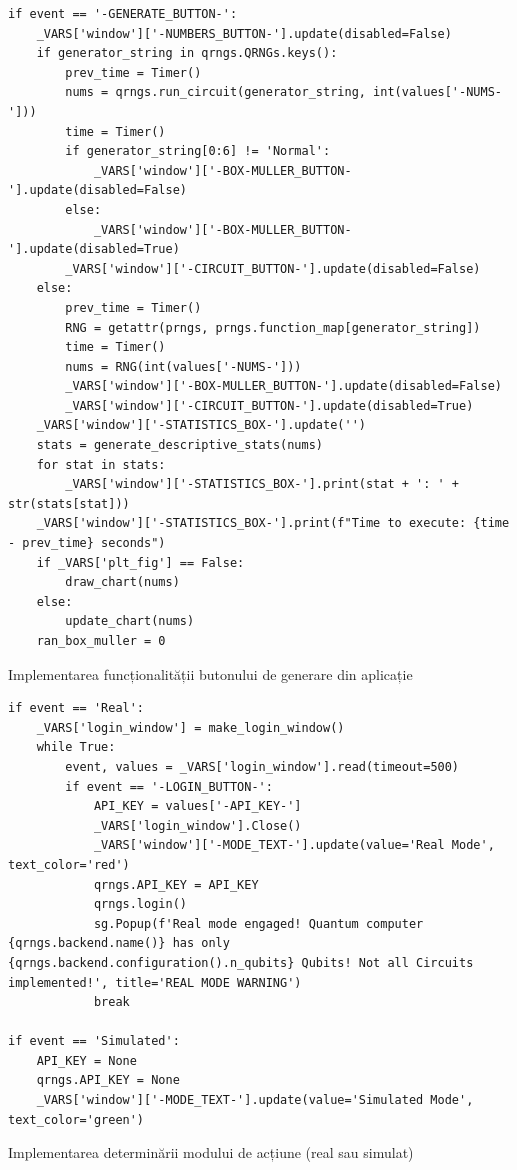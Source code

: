 \begin{code}
\begin{verbatim}
if event == '-GENERATE_BUTTON-':
    _VARS['window']['-NUMBERS_BUTTON-'].update(disabled=False)
    if generator_string in qrngs.QRNGs.keys():
        prev_time = Timer()
        nums = qrngs.run_circuit(generator_string, int(values['-NUMS-']))
        time = Timer()
        if generator_string[0:6] != 'Normal':
            _VARS['window']['-BOX-MULLER_BUTTON-'].update(disabled=False)
        else:
            _VARS['window']['-BOX-MULLER_BUTTON-'].update(disabled=True)
        _VARS['window']['-CIRCUIT_BUTTON-'].update(disabled=False)
    else:
        prev_time = Timer()
        RNG = getattr(prngs, prngs.function_map[generator_string])
        time = Timer()
        nums = RNG(int(values['-NUMS-']))
        _VARS['window']['-BOX-MULLER_BUTTON-'].update(disabled=False)
        _VARS['window']['-CIRCUIT_BUTTON-'].update(disabled=True)
    _VARS['window']['-STATISTICS_BOX-'].update('')
    stats = generate_descriptive_stats(nums)
    for stat in stats:
        _VARS['window']['-STATISTICS_BOX-'].print(stat + ': ' + str(stats[stat]))
    _VARS['window']['-STATISTICS_BOX-'].print(f"Time to execute: {time - prev_time} seconds")
    if _VARS['plt_fig'] == False:
        draw_chart(nums)
    else:
        update_chart(nums)
    ran_box_muller = 0
\end{verbatim}
\caption{Implementarea funcționalității butonului de generare din aplicație}
\end{code}
\newpage
\begin{code}
\begin{verbatim}
if event == 'Real':
    _VARS['login_window'] = make_login_window()
    while True:
        event, values = _VARS['login_window'].read(timeout=500)
        if event == '-LOGIN_BUTTON-':
            API_KEY = values['-API_KEY-']
            _VARS['login_window'].Close()
            _VARS['window']['-MODE_TEXT-'].update(value='Real Mode', text_color='red')
            qrngs.API_KEY = API_KEY
            qrngs.login()
            sg.Popup(f'Real mode engaged! Quantum computer {qrngs.backend.name()} has only {qrngs.backend.configuration().n_qubits} Qubits! Not all Circuits implemented!', title='REAL MODE WARNING')
            break

if event == 'Simulated':
    API_KEY = None
    qrngs.API_KEY = None
    _VARS['window']['-MODE_TEXT-'].update(value='Simulated Mode', text_color='green')
\end{verbatim}
\caption{Implementarea determinării modului de acțiune (real sau simulat)}
\end{code}

